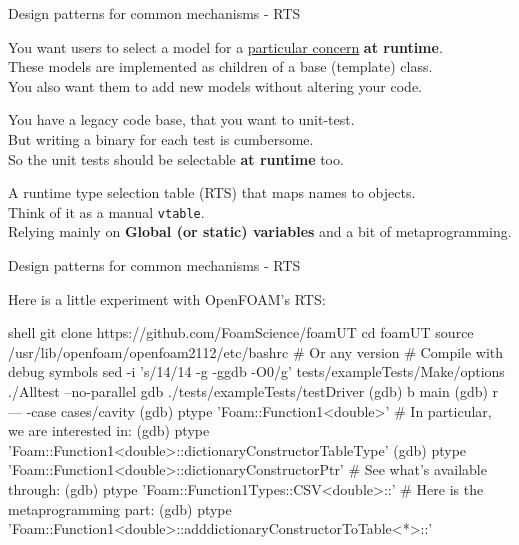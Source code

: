 \begin{frame}[fragile]{Design patterns for common mechanisms - RTS}

\begin{description}
    \item[Scenario 1\hspace{2cm}] \hspace{\linewidth}
        You want users to select a model for a \underline{particular concern} {\bf at runtime}.\\
        These models are implemented as children of a base (template) class.\\
        You also want them to add new models without altering your code.\\
    \item[Scenario 2\hspace{2cm}] \hspace{\linewidth}
        You have a legacy code base, that you want to unit-test.\\
        But writing a binary for each test is cumbersome.\\
        So the unit tests should be selectable {\bf at runtime} too.\\
    \item<2>[Solution\hspace{2cm}] \hspace{\linewidth}
        A runtime type selection table (RTS) that maps names to objects.\\
        Think of it as a manual {\tt vtable}.\\
        Relying mainly on {\bf Global (or static) variables} and a bit of metaprogramming.\\
\end{description}

\end{frame}

\begin{frame}[fragile]{Design patterns for common mechanisms - RTS}

Here is a little experiment with OpenFOAM's RTS:

\begin{CodeEnvNoComment}{shell}{\scriptsize}
git clone https://github.com/FoamScience/foamUT
cd foamUT
source /usr/lib/openfoam/openfoam2112/etc/bashrc # Or any version
# Compile with debug symbols
sed -i 's/14/14 -g -ggdb -O0/g' tests/exampleTests/Make/options
./Alltest --no-parallel
gdb ./tests/exampleTests/testDriver
    (gdb) b main
    (gdb) r --- -case cases/cavity
    (gdb) ptype 'Foam::Function1<double>'
    # In particular, we are interested in:
    (gdb) ptype 'Foam::Function1<double>::dictionaryConstructorTableType'
    (gdb) ptype 'Foam::Function1<double>::dictionaryConstructorPtr'
    # See what's available through:
    (gdb) ptype 'Foam::Function1Types::CSV<double>::'
    # Here is the metaprogramming part:
    (gdb) ptype 'Foam::Function1<double>::adddictionaryConstructorToTable<*>::'
\end{CodeEnvNoComment}
\end{frame}

